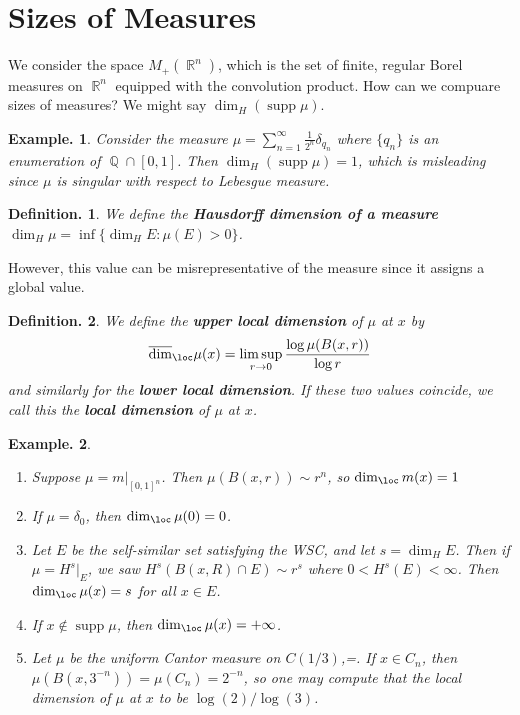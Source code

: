 \documentclass[11pt, a4paper]{memoir}
\DeclareMathOperator{\Q}{{\mathbb{Q}}}
\DeclareMathOperator{\R}{{\mathbb{R}}}
\theoremstyle{change}
\theoremstyle{plain}
\theoremstyle{nonumberplain}
\newtheorem{definition}{Definition.}
\newtheorem{example}{Example.}
\DeclareMathOperator{\supp}{supp}
\newcommand{\defn}[1]{{\boldmath\bfseries #1}}
\numberwithin{equation}{section}
\begin{document}
\section{Sizes of Measures}
We consider the space $M_+(\R^n)$, which is the set of finite, regular Borel measures on $\R^n$ equipped with the convolution product.
How can we compuare sizes of measures?
We might say $\dim_H(\supp\mu)$.
\begin{example}
    Consider the measure $\mu=\sum_{n=1}^\infty\frac{1}{2^n}\delta_{q_n}$ where $\{q_n\}$ is an enumeration of $\Q\cap[0,1]$.
    Then $\dim_H(\supp\mu)=1$, which is misleading since $\mu$ is singular with respect to Lebesgue measure.
\end{example}
\begin{definition}
    We define the \defn{Hausdorff dimension of a measure} $\dim_H\mu=\inf\{\dim_H E:\mu(E)>0\}$.
\end{definition}
However, this value can be misrepresentative of the measure since it assigns a global value.
\begin{definition}
    We define the \defn{upper local dimension} of $\mu$ at $x$ by
    \begin{equation*}
        \overline{\dim}_{\loc}\mu(x) = \limsup_{r\to 0}\frac{\log \mu(B(x,r))}{\log r}
    \end{equation*}
    and similarly for the \defn{lower local dimension}.
    If these two values coincide, we call this the \defn{local dimension} of $\mu$ at $x$.
\end{definition}
\begin{example}
    \begin{enumerate}[nl]
        \item Suppose $\mu=m|_{[0,1]^n}$.
            Then $\mu(B(x,r))\sim r^n$, so $\dim_{\loc}m(x)=1$
        \item If $\mu=\delta_0$, then $\dim_{\loc}\mu(0)=0$.
        \item Let $E$ be the self-similar set satisfying the WSC, and let $s=\dim_H E$.
            Then if $\mu=H^s|_E$, we saw $H^s(B(x,R)\cap E)\sim r^s$ where $0<H^s(E)<\infty$.
            Then $\dim_{\loc}\mu(x)=s$ for all $x\in E$.
        \item If $x\notin\supp\mu$, then $\dim_{\loc}\mu(x)=+\infty$.
        \item Let $\mu$ be the uniform Cantor measure on $C(1/3)$,=.
            If $x\in C_n$, then $\mu(B(x,3^{-n}))=\mu(C_n)=2^{-n}$, so one may compute that the local dimension of $\mu$ at $x$ to be $\log(2)/\log(3)$.
    \end{enumerate}
\end{example}
\end{document}
